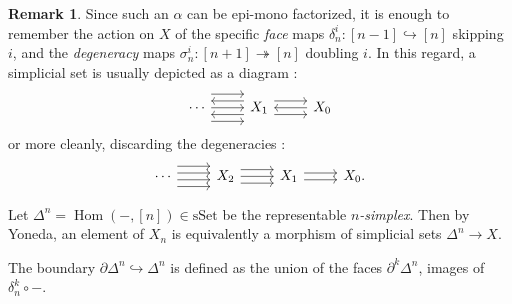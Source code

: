 \documentclass[11pt]{article}
\theoremstyle{definition}
\newtheorem{remark}{Remark}
\newcommand{\Hom}{\operatorname{Hom}}
\newcommand{\sSet}{\mathrm{sSet}}
\begin{document}
\begin{remark}
    Since such an $\alpha$ can be epi-mono factorized, it is enough to remember the action on $X$ of the specific \emph{face} maps $\delta_n^i : [n-1] \hookrightarrow [n]$ skipping $i$, and the \emph{degeneracy} maps $\sigma_n^i : [n+1] \twoheadrightarrow [n]$ doubling $i$.
    In this regard, a simplicial set is usually depicted as a diagram :
    \[\begin{tikzcd}
        \cdots & {X_1} & {X_0}
        \arrow[from=1-1, to=1-2]
        \arrow[shift right=4, from=1-1, to=1-2]
        \arrow[shift left=4, from=1-1, to=1-2]
        \arrow[shift left=2, from=1-2, to=1-1]
        \arrow[shift right=2, from=1-2, to=1-1]
        \arrow[shift left=2, from=1-2, to=1-3]
        \arrow[shift right=2, from=1-2, to=1-3]
        \arrow[from=1-3, to=1-2]
    \end{tikzcd}\]
    or more cleanly, discarding the degeneracies :
    \[\begin{tikzcd}
        \cdots & {X_2} & {X_1} & {X_0.}
        \arrow[shift left, from=1-1, to=1-2]
        \arrow[shift left=3, from=1-1, to=1-2]
        \arrow[shift right, from=1-1, to=1-2]
        \arrow[shift right=3, from=1-1, to=1-2]
        \arrow[from=1-2, to=1-3]
        \arrow[shift left=2, from=1-2, to=1-3]
        \arrow[shift right=2, from=1-2, to=1-3]
        \arrow[shift left, from=1-3, to=1-4]
        \arrow[shift right, from=1-3, to=1-4]
    \end{tikzcd}\]
\end{remark}

Let $\Delta^n = \Hom(-, [n]) \in \sSet$ be the representable \emph{$n$-simplex}.
Then by Yoneda, an element of $X_n$ is equivalently a morphism of simplicial sets $\Delta^n \to X$.

The boundary $\partial \Delta^n \hookrightarrow \Delta^n$ is defined as the union of the faces $\partial^k \Delta^n$, images of $\delta_n^k \circ -$.
\end{document}
